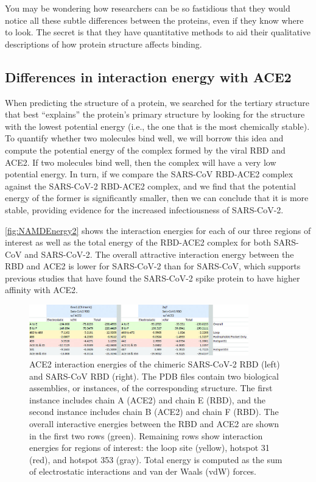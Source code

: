 You may be wondering how researchers can be so fastidious that they would notice all these subtle differences between the proteins, even if they know where to look. The secret is that they have quantitative methods to aid their qualitative descriptions of how protein structure affects binding.

\FloatBarrier
{}
\subsection{Differences in interaction energy with ACE2}

When predicting the structure of a protein, we searched for the tertiary structure that best ``explains'' the protein's primary structure by looking for the structure with the lowest potential energy (i.e., the one that is the most chemically stable). To quantify whether two molecules bind well, we will borrow this idea and compute the potential energy of the complex formed by the viral RBD and ACE2. If two molecules bind well, then the complex will have a very low potential energy. In turn, if we compare the SARS-CoV RBD-ACE2 complex against the SARS-CoV-2 RBD-ACE2 complex, and we find that the potential energy of the former is significantly smaller, then we can conclude that it is more stable, providing evidence for the increased infectiousness of SARS-CoV-2.

\autoref{fig:NAMDEnergy2} shows the interaction energies for each of our three regions of interest as well as the total energy of the RBD-ACE2 complex for both SARS-CoV and SARS-CoV-2. The overall attractive interaction energy between the RBD and ACE2 is lower for SARS-CoV-2 than for SARS-CoV, which supports previous studies that have found the SARS-CoV-2 spike protein to have higher affinity with ACE2.

\begin{figure}[h]
	\centering
	\mySfFamily
	\includegraphics[width = 0.85\textwidth]{../images_CMYK/NAMDEnergy2}
	\caption{ACE2 interaction energies of the chimeric SARS-CoV-2 RBD (left) and SARS-CoV RBD (right). The PDB files contain two biological assemblies, or instances, of the corresponding structure. The first instance includes chain A (ACE2) and chain E (RBD), and the second instance includes chain B (ACE2) and chain F (RBD). The overall interactive energies between the RBD and ACE2 are shown in the first two rows (green). Remaining rows show interaction energies for regions of interest: the loop site (yellow), hotspot 31 (red), and hotspot 353 (gray). Total energy is computed as the sum of electrostatic interactions and van der Waals (vdW) forces.}
	\label{fig:NAMDEnergy2}
\end{figure}

